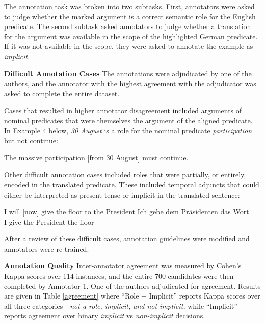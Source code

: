 \documentclass[11pt]{article}
\begin{document}
The annotation task was broken into two subtasks. First, annotators were asked to judge whether the marked argument is a correct semantic role for the English predicate. The second subtask asked annotators to judge whether a translation for the argument was available in the scope of the highlighted German predicate. If it was not available in the scope, they were asked to annotate the example as \textit{implicit}. 

{\bf  \flushleft Difficult Annotation Cases}
The annotations were adjudicated by one of the authors, and the annotator with the highest agreement with the adjudicator was asked to complete the entire dataset. 

Cases that resulted in higher annotator disagreement included arguments of nominal predicates that were themselves the argument of the aligned predicate. In Example 4 below, \textit{30 August} is a role for the nominal predicate \textit{participation} but not \underline{continue}:
\begin{exe}
\ex The massive participation [from 30 August] must \underline{continue}.
\end{exe}

Other difficult annotation cases included roles that were partially, or entirely, encoded in the translated predicate. These included temporal adjuncts that could either be interpreted as present tense or implicit in the translated sentence:
\begin{exe}
\ex I will [now] \underline{give} the floor to the President \vspace*{-2mm}
\gll Ich  \underline{gebe} dem Pr{\"a}sidenten das Wort \\
I  give the President the floor \\
\end{exe}

After a review of these difficult cases, annotation guidelines were modified and annotators were re-trained. 

{\bf \flushleft Annotation Quality}
Inter-annotator agreement was measured by Cohen's Kappa scores over 114 instances, and the entire 700 candidates were then completed by Annotator 1. One of the authors adjudicated for agreement. 
Results are given in Table \ref{agreement} where ``Role + Implicit'' reports Kappa scores over all three categories - \textit{not a role, implicit, and not implicit,} while ``Implicit'' reports agreement over binary \textit{implicit} vs \textit{non-implicit} decisions.
\end{document}
